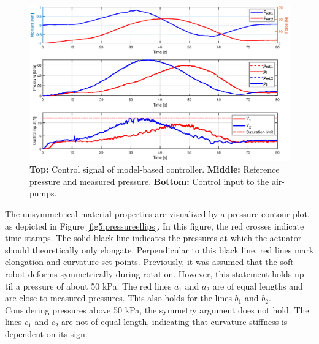 \begin{figure}[H]
    \centering
    \includegraphics[width = \textwidth]{Figures/Chapter5/controlsignalextend.eps}
    \caption{\textbf{Top:} Control signal of model-based controller. \textbf{Middle:} Reference pressure and measured pressure. \textbf{Bottom:} Control input to the air-pumps.}
    \label{fig5:controlellips}
\end{figure}

The unsymmetrical material properties are visualized by a pressure contour plot, as depicted in Figure \ref{fig5:pressureellips}. In this figure, the red crosses indicate time stamps. The solid black line indicates the pressures at which the actuator should theoretically only elongate. Perpendicular to this black line, red lines mark elongation and curvature set-points. Previously, it was assumed that the soft robot deforms symmetrically during rotation. However, this statement holds up til a pressure of about 50 kPa. The red lines $a_1$ and $a_2$ are of equal lengths and are close to measured pressures. This also holds for the lines $b_1$ and $b_2$. Considering pressures above 50 kPa, the symmetry argument does not hold. The lines $c_1$ and $c_2$ are not of equal length, indicating that curvature stiffness is dependent on its sign. 





